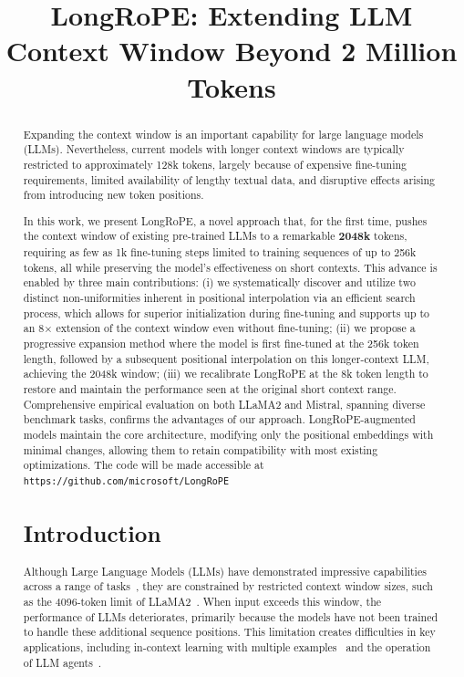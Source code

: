 \title{LongRoPE: Extending LLM Context Window Beyond 2 Million Tokens}

\begin{abstract}
Expanding the context window is an important capability for large language models (LLMs). Nevertheless, current models with longer context windows are typically restricted to approximately 128k tokens, largely because of expensive fine-tuning requirements, limited availability of lengthy textual data, and disruptive effects arising from introducing new token positions.

In this work, we present LongRoPE, a novel approach that, for the first time, pushes the context window of existing pre-trained LLMs to a remarkable \textbf{2048k} tokens, requiring as few as 1k fine-tuning steps limited to training sequences of up to 256k tokens, all while preserving the model’s effectiveness on short contexts. This advance is enabled by three main contributions: (i) we systematically discover and utilize two distinct non-uniformities inherent in positional interpolation via an efficient search process, which allows for superior initialization during fine-tuning and supports up to an 8$\times$ extension of the context window even without fine-tuning; (ii) we propose a progressive expansion method where the model is first fine-tuned at the 256k token length, followed by a subsequent positional interpolation on this longer-context LLM, achieving the 2048k window; (iii) we recalibrate LongRoPE at the 8k token length to restore and maintain the performance seen at the original short context range. Comprehensive empirical evaluation on both LLaMA2 and Mistral, spanning diverse benchmark tasks, confirms the advantages of our approach. LongRoPE-augmented models maintain the core architecture, modifying only the positional embeddings with minimal changes, allowing them to retain compatibility with most existing optimizations. The code will be made accessible at \texttt{https://github.com/microsoft/LongRoPE}

\section{Introduction}

Although Large Language Models (LLMs) have demonstrated impressive capabilities across a range of tasks~\cite{gpt4,llama2}, they are constrained by restricted context window sizes, such as the 4096-token limit of LLaMA2~\cite{llama2}. When input exceeds this window, the performance of LLMs deteriorates, primarily because the models have not been trained to handle these additional sequence positions. This limitation creates difficulties in key applications, including in-context learning with multiple examples~\cite{Huang2023FewerIM} and the operation of LLM agents~\cite{park2023generative,madaan2023selfrefine}.


\end{abstract}
